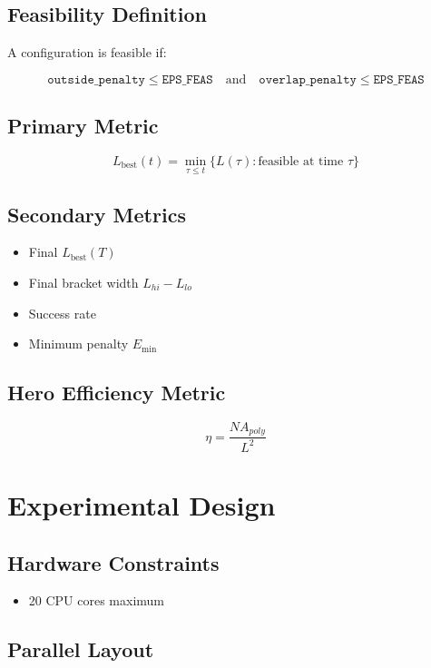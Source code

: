 \documentclass[11pt]{report}
\newcommand{\Lbest}{L_{\text{best}}}
\newcommand{\Emin}{E_{\min}}
\newcommand{\EPSFEAS}{\texttt{EPS\_FEAS}}
\begin{document}
\section{Feasibility Definition}

A configuration is feasible if:

\[
\texttt{outside\_penalty} \le \EPSFEAS
\quad \text{and} \quad
\texttt{overlap\_penalty} \le \EPSFEAS
\]

\section{Primary Metric}

\[
\Lbest(t) =
\min_{\tau \le t}
\{ L(\tau) : \text{feasible at time } \tau \}
\]

\section{Secondary Metrics}

\begin{itemize}
    \item Final $\Lbest(T)$
    \item Final bracket width $L_{hi} - L_{lo}$
    \item Success rate
    \item Minimum penalty $\Emin$
\end{itemize}

\section{Hero Efficiency Metric}

\[
\eta = \frac{N A_{poly}}{L^2}
\]

\chapter{Experimental Design}

\section{Hardware Constraints}

\begin{itemize}
    \item 20 CPU cores maximum
\end{itemize}

\section{Parallel Layout}
\end{document}
